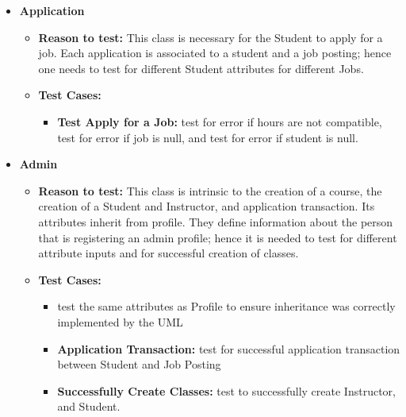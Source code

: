 \documentclass[12pt]{report}
\begin{document}
\begin{itemize}
        	\item \textbf{Application}
        	\begin{itemize}
        		\item \textbf{Reason to test:} This class is necessary for the Student to apply for a job. Each application is associated to a student and a job posting; hence one needs to test for different Student attributes for different Jobs.
        		\item \textbf{Test Cases:} 
        		\begin{itemize}
        			\item \textbf{Test Apply for a Job:} test for error if hours are not compatible, test for error if job is null, and test for error if student is null.
        		\end{itemize}
        		
        	\end{itemize}
        \end{itemize}
        
        \begin{itemize}
        	\item \textbf{Admin}
        	\begin{itemize}
        		\item \textbf{Reason to test:} This class is intrinsic to the creation of a course, the creation of a Student and Instructor, and application transaction. Its attributes inherit from profile. They define information about the person that is registering an admin profile; hence it is needed to test for different attribute inputs and for successful creation of classes.
        		\item \textbf{Test Cases:} 
        		\begin{itemize}
        			\item test the same attributes as Profile to ensure inheritance was correctly implemented by the UML
        			\item \textbf{Application Transaction:} test for successful application transaction between Student and Job Posting
        			\item \textbf{Successfully Create Classes:} test to successfully create Instructor, and Student.
        		\end{itemize}
        		
        	\end{itemize}
        \end{itemize}
    
\end{document}
